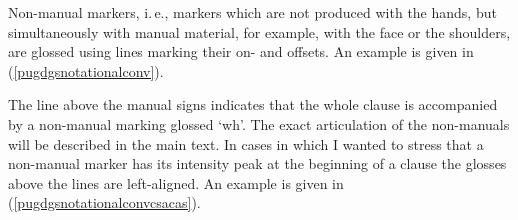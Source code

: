 \begin{refsection}
Non-manual markers, i.\,e., markers which are not produced with the hands, but simultaneously with manual material, for example, with the face or the shoulders, are glossed using lines marking their on- and offsets. An example is given in (\ref{pugdgsnotationalconv}).


\begin{exe}
\ex\label{pugdgsnotationalconv}
\end{exe}




\noindent The line above the manual signs indicates that the whole clause is accompanied by a non-manual marking glossed `wh'. The exact articulation of the non-manuals will be described in the main text. In cases in which I wanted to stress that a non-manual marker has its intensity peak at the beginning of a clause the glosses above the lines are left-aligned. An example is given in (\ref{pugdgsnotationalconvcsacas}).

\begin{exe}
\ex\label{pugdgsnotationalconvcsacas}
\end{exe}

\printbibliography[heading=subbibliography]
\end{refsection}
